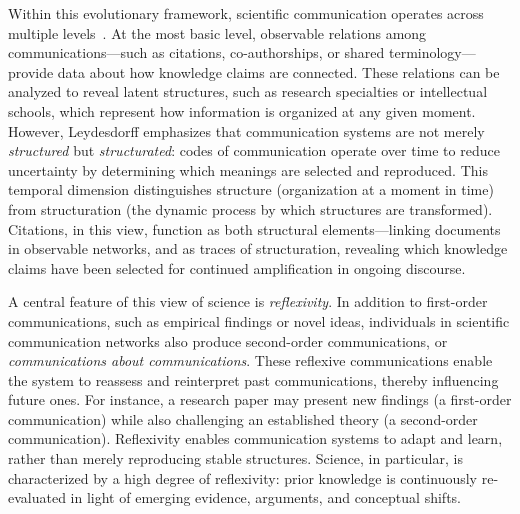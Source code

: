 \documentclass[12pt]{article} %
\begin{document}
Within this evolutionary framework, scientific communication operates across multiple levels~\cite{leydesdorff2010communication}. 
At the most basic level, observable relations among communications---such as citations, co-authorships, or shared terminology---provide data about how knowledge claims are connected. 
These relations can be analyzed to reveal latent structures, such as research specialties or intellectual schools, which represent how information is organized at any given moment.
However, Leydesdorff emphasizes that communication systems are not merely \textit{structured} but \textit{structurated}: codes of communication operate over time to reduce uncertainty by determining which meanings are selected and reproduced. 
This temporal dimension distinguishes structure (organization at a moment in time) from structuration (the dynamic process by which structures are transformed). 
Citations, in this view, function as both structural elements—linking documents in observable networks, and as traces of structuration, revealing which knowledge claims have been selected for continued amplification in ongoing discourse.

A central feature of this view of science is \textit{reflexivity}.  
In addition to first-order communications, such as empirical findings or novel ideas, individuals in scientific communication networks also produce second-order communications, or \textit{communications about communications}.
These reflexive communications enable the system to reassess and reinterpret past communications, thereby influencing future ones.
For instance, a research paper may present new findings (a first-order communication) while also challenging an established theory (a second-order communication).
Reflexivity enables communication systems to adapt and learn, rather than merely reproducing stable structures.
Science, in particular, is characterized by a high degree of reflexivity: prior knowledge is continuously re-evaluated in light of emerging evidence, arguments, and conceptual shifts.
\end{document}
